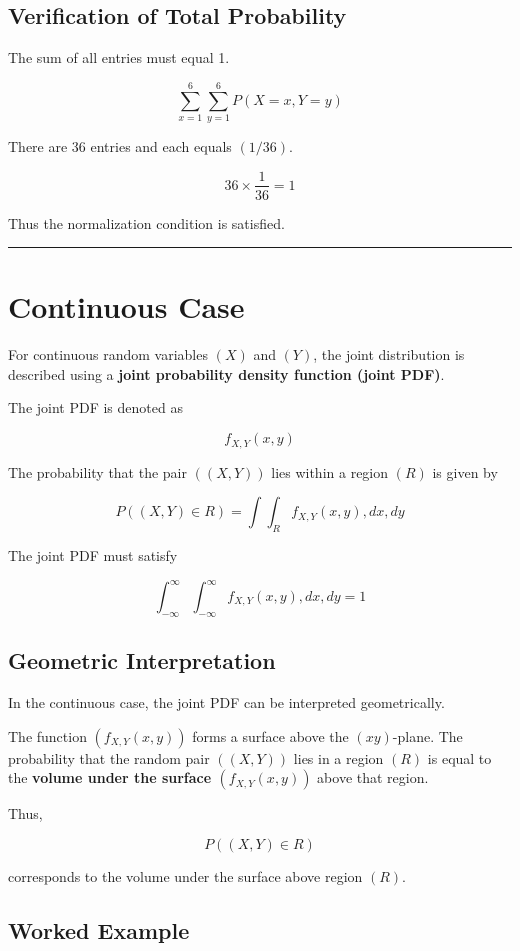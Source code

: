 \documentclass[12pt]{article}
\begin{document}
\subsection*{Verification of Total Probability}

The sum of all entries must equal 1.

\[
\sum_{x=1}^{6}\sum_{y=1}^{6} P(X=x,Y=y)
\]

There are 36 entries and each equals $(1/36)$.

\[
36 \times \frac{1}{36} = 1
\]

Thus the normalization condition is satisfied.

\hrule
\vspace{0.5cm}

\section*{Continuous Case}

For continuous random variables $(X)$ and $(Y)$, the joint distribution is described using a \textbf{joint probability density function (joint PDF)}.

The joint PDF is denoted as

\[
f_{X,Y}(x,y)
\]

The probability that the pair $((X,Y))$ lies within a region $(R)$ is given by

\[
P((X,Y) \in R) =
\int\int_R f_{X,Y}(x,y),dx,dy
\]

The joint PDF must satisfy

\[
\int_{-\infty}^{\infty} \int_{-\infty}^{\infty} f_{X,Y}(x,y),dx,dy = 1
\]

\subsection*{Geometric Interpretation}

In the continuous case, the joint PDF can be interpreted geometrically.

The function $(f_{X,Y}(x,y))$ forms a surface above the $(xy)$-plane. The probability that the random pair $((X,Y))$ lies in a region $(R)$ is equal to the \textbf{volume under the surface $(f_{X,Y}(x,y))$} above that region.

Thus,

\[
P((X,Y)\in R)
\]

corresponds to the volume under the surface above region $(R)$.

\subsection*{Worked Example}
\end{document}
